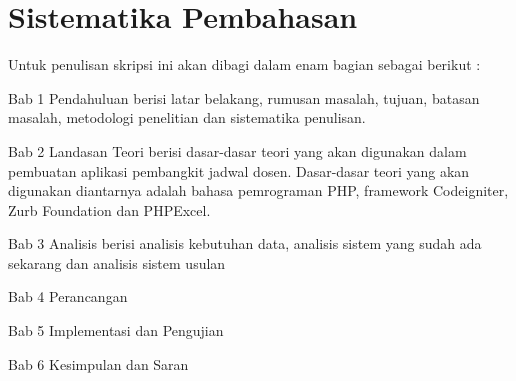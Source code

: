 \section{Sistematika Pembahasan}
\label{sec:sispem}
Untuk penulisan skripsi ini akan dibagi dalam enam bagian sebagai berikut :

Bab 1 Pendahuluan berisi latar belakang, rumusan masalah, tujuan, batasan masalah,  metodologi penelitian dan sistematika penulisan.

Bab 2 Landasan Teori berisi dasar-dasar teori yang akan digunakan dalam pembuatan aplikasi pembangkit jadwal dosen. Dasar-dasar teori yang akan digunakan diantarnya adalah bahasa pemrograman PHP, framework Codeigniter, Zurb Foundation dan PHPExcel.

Bab 3 Analisis berisi analisis kebutuhan data, analisis sistem yang sudah ada sekarang dan analisis sistem usulan

Bab 4 Perancangan

Bab 5 Implementasi dan Pengujian

Bab 6 Kesimpulan dan Saran
